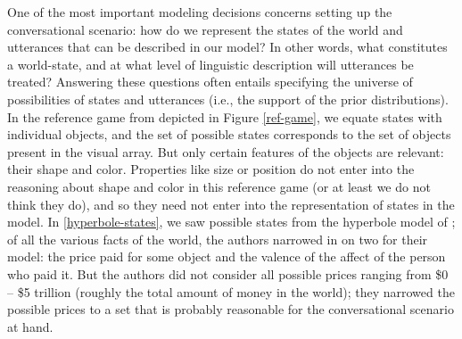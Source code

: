 \documentclass{sp}
\begin{document}


One of the most important modeling decisions concerns setting up the conversational scenario: how do we represent the states of the world and utterances that can be described in our model? In other words, what constitutes a world-state, and at what level of linguistic description will utterances be treated? Answering these questions often entails specifying the universe of possibilities of states and utterances (i.e., the support of the prior distributions).
In the reference game from \cite{frankgoodman2012} depicted in Figure \ref{ref-game}, we equate states with individual objects, and the set of possible states corresponds to the set of objects present in the visual array. But only certain features of the objects are relevant: their shape and color. Properties like size or position do not enter into the reasoning about shape and color in this reference game (or at least we do not think they do), and so they need not enter into the representation of states in the model. In \ref{hyperbole-states}, we saw possible states from the hyperbole model of \cite{kaoetal2014}; of all the various facts of the world, the authors narrowed in on two for their model: the price paid for some object and the valence of the affect of the person who paid it. 
But the authors did not consider all possible prices ranging from \$0  -- \$5 trillion (roughly the total amount of money in the world); they narrowed the possible prices to a set that is probably reasonable for the conversational scenario at hand.
\end{document}
